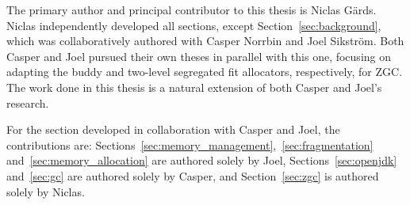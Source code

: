 
The primary author and principal contributor to this thesis is Niclas Gärds. Niclas independently developed all sections, except Section~\ref{sec:background}, which was collaboratively authored with Casper Norrbin and Joel Sikström. Both Casper and Joel pursued their own theses in parallel with this one, focusing on adapting the buddy and two-level segregated fit allocators, respectively, for ZGC. The work done in this thesis is a natural extension of both Casper and Joel's research.

For the section developed in collaboration with Casper and Joel, the contributions are: Sections~\ref{sec:memory_management},~\ref{sec:fragmentation} and~\ref{sec:memory_allocation} are authored solely by Joel, Sections~\ref{sec:openjdk} and~\ref{sec:gc} are authored solely by Casper, and Section~\ref{sec:zgc} is authored solely by Niclas.
